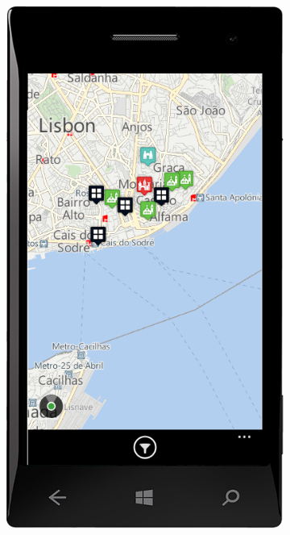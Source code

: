 \documentclass{book}
\begin{document}
\begin{figure}[H]
\begin{subfigure}{0.3\textwidth}
						\includegraphics[width=\textwidth]{screenshots/mobile/mobile9.png}
						\caption{\label{subfig:mobile_map}}
					\end{subfigure}
					\hfill
					\begin{subfigure}{0.3\textwidth}

\end{subfigure}
\end{figure}
\end{document}
